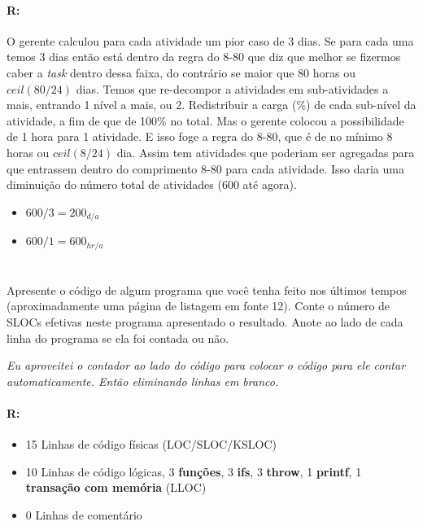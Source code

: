 \documentclass[10pt,a5paper]{report}
\begin{document}
\paragraph{R:}

O gerente calculou para cada atividade um pior caso de 3 dias. Se para cada uma
temos 3 dias então está dentro da regra do 8-80 que diz que melhor se fizermos
caber a \textit{task} dentro dessa faixa, do contrário se maior que 80 horas ou
$ceil(80/24)$ dias. Temos que re-decompor a atividades em sub-atividades a mais,
entrando 1 nível a mais, ou 2. Redistribuir a carga (\%) de cada sub-nível da
atividade, a fim de que de 100\% no total. Mas o gerente colocou a possibilidade
de 1 hora para 1 atividade. E isso foge a regra do 8-80, que é de no mínimo 8
horas ou $ceil(8/24)$ dia. Assim tem atividades que poderiam ser agregadas para
que entrassem dentro do comprimento 8-80 para cada atividade. Isso daria uma
diminuição do número total de atividades (600 até agora).

\begin{itemize}
\item $600 / 3 = 200_{d/a}$
\item $600 / 1 = 600_{hr/a}$
\end{itemize}

\section{}

\qquad Apresente o código de algum programa que você tenha feito nos últimos
tempos (aproximadamente uma página de listagem em fonte 12). Conte o número de
SLOCs efetivas neste programa apresentado o resultado. Anote ao lado de cada
linha do programa se ela foi contada ou não.

\textit{Eu aproveitei o contador ao lado do código para colocar o código para
ele contar automaticamente. Então eliminando linhas em branco.}

\paragraph{R:}

\begin{itemize}
\item 15 Linhas de código físicas (LOC/SLOC/KSLOC)
\item 10 Linhas de código lógicas, 3 \textbf{funções}, 3 \textbf{ifs}, 3 \textbf{throw}, 1 \textbf{printf}, 1 \textbf{transação com memória} (LLOC)
\item 0 Linhas de comentário
\end{itemize}
\end{document}
